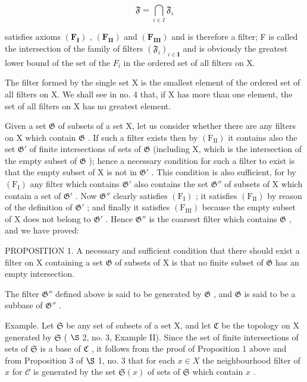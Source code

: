 \[
\mathfrak {F} = \bigcap_ {i \in I} \mathfrak {F} _ {i}
\]

satisfies axioms \((\mathbf{F}_{\mathbf{I}})\) , \((\mathbf{F}_{\mathbf{II}})\) and \((\mathbf{F}_{\mathbf{III}})\) and is therefore a filter; F is called the intersection of the family of filters \((\mathfrak{F}_{i})_{i\in\mathbf{I}}\) and is obviously the greatest lower bound of the set of the \(F_{i}\) in the ordered set of all filters on X.

The filter formed by the single set X is the smallest element of the ordered set of all filters on X. We shall see in no. 4 that, if X has more than one element, the set of all filters on X has no greatest element.

Given a set \(\mathfrak{G}\) of subsets of a set X, let us consider whether there are any filters on X which contain \(\mathfrak{G}\) . If such a filter exists then by \((\mathrm{F}_{\mathrm{II}})\) it contains also the set \(\mathfrak{G}'\) of finite intersections of sets of \(\mathfrak{G}\) (including X, which is the intersection of the empty subset of \(\mathfrak{G}\) ); hence a necessary condition for such a filter to exist is that the empty subset of X is not in \(\mathfrak{G}'\) . This condition is also sufficient, for by \((\mathrm{F}_{\mathrm{I}})\) any filter which contains \(\mathfrak{G}'\) also contains the set \(\mathfrak{G}''\) of subsets of X which contain a set of \(\mathfrak{G}'\) . Now \(\mathfrak{G}''\) clearly satisfies \((\mathrm{F}_{\mathrm{I}})\) ; it satisfies \((\mathrm{F}_{\mathrm{II}})\) by reason of the definition of \(\mathfrak{G}'\) ; and finally it satisfies \((\mathrm{F}_{\mathrm{III}})\) because the empty subset of X does not belong to \(\mathfrak{G}'\) . Hence \(\mathfrak{G}''\) is the coarsest filter which contains \(\mathfrak{G}\) , and we have proved:

PROPOSITION 1. A necessary and sufficient condition that there should exist a filter on X containing a set \(\mathfrak{G}\) of subsets of X is that no finite subset of \(\mathfrak{G}\) has an empty intersection.

The filter \(\mathfrak{G}''\) defined above is said to be generated by \(\mathfrak{G}\) , and \(\mathfrak{G}\) is said to be a subbase of \(\mathfrak{G}''\) .

Example. Let \(\mathfrak{S}\) be any set of subsets of a set X, and let \(\mathfrak{C}\) be the topology on X generated by \(\mathfrak{S}\) ( \(\S\) 2, no. 3, Example II). Since the set of finite intersections of sets of \(\mathfrak{S}\) is a base of \(\mathfrak{C}\) , it follows from the proof of Proposition 1 above and from Proposition 3 of \(\S\) 1, no. 3 that for each \(x \in X\) the neighbourhood filter of \(x\) for \(\mathcal{C}\) is generated by the set \(\mathfrak{S}(x)\) of sets of \(\mathfrak{S}\) which contain \(x\) .

